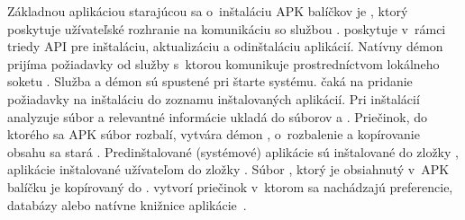 \noindent Základnou aplikáciou starajúcou sa o~inštaláciu APK balíčkov je , ktorý poskytuje užívateľské rozhranie na komunikáciu so službou .   poskytuje v~rámci triedy  API pre inštaláciu, aktualizáciu a odinštaláciu aplikácií. Natívny démon  prijíma požiadavky od služby  s~ktorou komunikuje prostredníctvom lokálneho soketu . Služba  a démon  sú spustené pri štarte systému.  čaká na pridanie požiadavky na inštaláciu do zoznamu inštalovaných aplikácií. Pri inštalácií analyzuje súbor  a relevantné informácie ukladá do súborov  a . Priečinok, do ktorého sa APK súbor rozbalí, vytvára démon , o~rozbalenie a kopírovanie obsahu sa stará . Predinštalované (systémové) aplikácie sú inštalované do zložky , aplikácie inštalované užívateľom do zložky . Súbor , ktorý je obsiahnutý v~APK balíčku je kopírovaný do .  vytvorí priečinok  v~ktorom sa nachádzajú preferencie, databázy alebo natívne knižnice aplikácie~\cite{Parmar2013}.